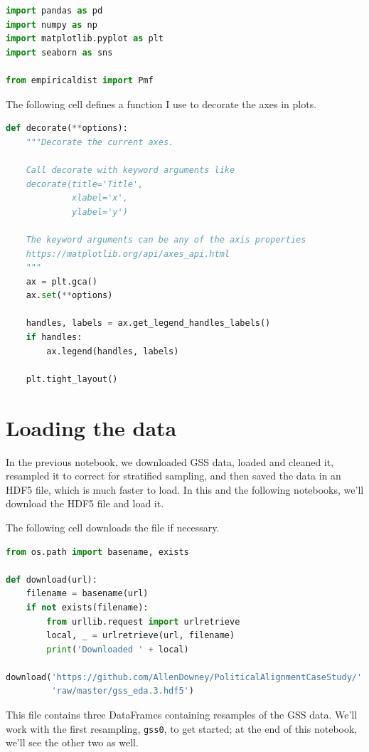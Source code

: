 \begin{lstlisting}[language=Python]
import pandas as pd
import numpy as np
import matplotlib.pyplot as plt
import seaborn as sns

from empiricaldist import Pmf
\end{lstlisting}

The following cell defines a function I use to decorate the axes in
plots.

\begin{lstlisting}[language=Python]
def decorate(**options):
    """Decorate the current axes.
    
    Call decorate with keyword arguments like
    decorate(title='Title',
             xlabel='x',
             ylabel='y')
             
    The keyword arguments can be any of the axis properties
    https://matplotlib.org/api/axes_api.html
    """
    ax = plt.gca()
    ax.set(**options)
    
    handles, labels = ax.get_legend_handles_labels()
    if handles:
        ax.legend(handles, labels)

    plt.tight_layout()
\end{lstlisting}

\hypertarget{loading-the-data}{%
\section{Loading the data}\label{loading-the-data}}

In the previous notebook, we downloaded GSS data, loaded and cleaned it,
resampled it to correct for stratified sampling, and then saved the data
in an HDF5 file, which is much faster to load. In this and the following
notebooks, we'll download the HDF5 file and load it.

The following cell downloads the file if necessary.

\begin{lstlisting}[language=Python]
from os.path import basename, exists

def download(url):
    filename = basename(url)
    if not exists(filename):
        from urllib.request import urlretrieve
        local, _ = urlretrieve(url, filename)
        print('Downloaded ' + local)

download('https://github.com/AllenDowney/PoliticalAlignmentCaseStudy/' +
         'raw/master/gss_eda.3.hdf5')
\end{lstlisting}

This file contains three DataFrames containing resamples of the GSS
data. We'll work with the first resampling,
\passthrough{\lstinline!gss0!}, to get started; at the end of this
notebook, we'll see the other two as well.

